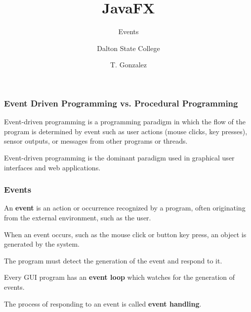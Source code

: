 \documentclass{beamer}
\title[Events]{JavaFX}
\subtitle{Events} %
\author[]{Dalton State College}
\date[T. Gonzalez]{T. Gonzalez}
\begin{document}
\begin{frame}

	\titlepage
	
\end{frame}

\begin{frame}

    \frametitle{Event Driven Programming vs. Procedural Programming}
    
    Event-driven programming is a programming paradigm in which the flow of the program is determined by event such as user actions (mouse clicks, key presses), sensor outputs, or messages from other programs or threads.
    
    \bigskip
        
    Event-driven programming is the dominant paradigm used in graphical user interfaces and web applications.        
    
\end{frame}

\begin{frame}
    
    \frametitle{Events}
    
    An \textbf{event} is an action or occurrence recognized by a program, often originating from the external environment, such as the user.
    
    \bigskip
    
    When an event occurs, such as the mouse click or button key press, an object is generated by the system.
    
    \bigskip
    
    The program must detect the generation of the event and respond to it.

    \bigskip
        
    Every GUI program has an \textbf{event loop} which watches for the generation of events.
    
    \bigskip
    
    The process of responding to an event is called \textbf{event handling}.
    
    \bigskip
    
    
\end{frame}
\end{document}
